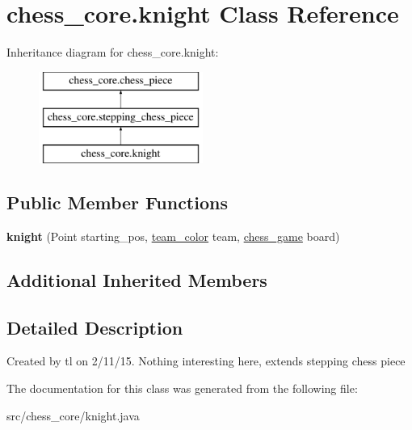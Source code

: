 \hypertarget{classchess__core_1_1knight}{}\section{chess\+\_\+core.\+knight Class Reference}
\label{classchess__core_1_1knight}
Inheritance diagram for chess\+\_\+core.\+knight\+:\begin{figure}[H]
\begin{center}
\leavevmode
\includegraphics[height=3.000000cm]{classchess__core_1_1knight}
\end{center}
\end{figure}
\subsection*{Public Member Functions}
\begin{DoxyCompactItemize}
\item 
\hypertarget{classchess__core_1_1knight_aa6b9c2401b5f0c1e2642b2c57810b882}{}{\bfseries knight} (Point starting\+\_\+pos, \hyperlink{enumchess__core_1_1team__color}{team\+\_\+color} team, \hyperlink{classchess__core_1_1chess__game}{chess\+\_\+game} board)\label{classchess__core_1_1knight_aa6b9c2401b5f0c1e2642b2c57810b882}

\end{DoxyCompactItemize}
\subsection*{Additional Inherited Members}


\subsection{Detailed Description}
Created by tl on 2/11/15. Nothing interesting here, extends stepping chess piece 

The documentation for this class was generated from the following file\+:\begin{DoxyCompactItemize}
\item 
src/chess\+\_\+core/knight.\+java\end{DoxyCompactItemize}
